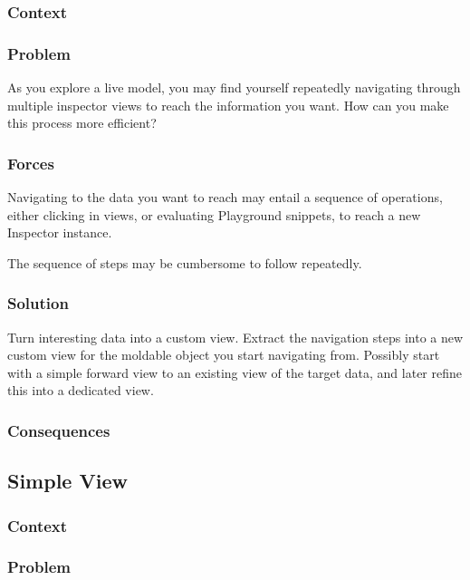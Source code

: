 \documentclass[sigconf]{acmart}
\begin{document}
\subsubsection*{Context}
\subsubsection*{Problem}

As you explore a live model, you may find yourself repeatedly navigating through multiple inspector views to reach the information you want. How can you make this process more efficient?

\subsubsection*{Forces}

Navigating to the data you want to reach may entail a sequence of operations, either clicking in views, or evaluating Playground snippets, to reach a new Inspector instance.

The sequence of steps may be cumbersome to follow repeatedly.

\subsubsection*{Solution}

Turn interesting data into a custom view.
Extract the navigation steps into a new custom view for the moldable object you start navigating from. Possibly start with a simple forward view to an existing view of the target data, and later refine this into a dedicated view.


\subsubsection*{Consequences}

\subsection*{Simple View}\label{pat:simpleView}
\subsubsection*{Context}
\subsubsection*{Problem}
\end{document}
